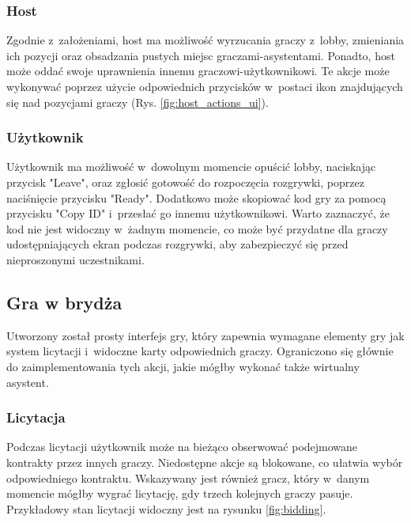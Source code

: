 \FloatBarrier

\subsubsection{Host}

Zgodnie z~założeniami, host ma możliwość wyrzucania graczy
z~lobby, zmieniania ich pozycji oraz obsadzania pustych
miejsc graczami-asystentami. Ponadto, host może oddać swoje
uprawnienia innemu graczowi-użytkownikowi. Te akcje może
wykonywać poprzez użycie odpowiednich przycisków w~postaci
ikon znajdujących się nad pozycjami graczy (Rys. \ref{fig:host_actions_ui}).

\subsubsection{Użytkownik}

Użytkownik ma możliwość w~dowolnym momencie opuścić lobby, naciskając przycisk "Leave",
oraz zgłosić gotowość do rozpoczęcia rozgrywki, poprzez naciśnięcie przycisku "Ready".
Dodatkowo może skopiować kod gry za pomocą przycisku "Copy ID"\xspace i~przesłać go innemu
użytkownikowi. Warto zaznaczyć, że kod nie jest widoczny w~żadnym momencie, co może być
przydatne dla graczy udostępniających ekran podczas rozgrywki, aby zabezpieczyć się przed
nieproszonymi uczestnikami.

\subsection{Gra w brydża}

Utworzony został prosty interfejs gry, który zapewnia
wymagane elementy gry jak system licytacji i~widoczne
karty odpowiednich graczy. Ograniczono się głównie do
zaimplementowania tych akcji, jakie mógłby wykonać także
wirtualny asystent.

\subsubsection{Licytacja}

Podczas licytacji użytkownik może na bieżąco obserwować
podejmowane kontrakty przez innych graczy. Niedostępne akcje
są blokowane, co ułatwia wybór odpowiedniego kontraktu.
Wskazywany jest również gracz, który w~danym momencie
mógłby wygrać licytację, gdy trzech kolejnych graczy
pasuje. Przykładowy stan licytacji widoczny jest na rysunku
\ref{fig:bidding}.

